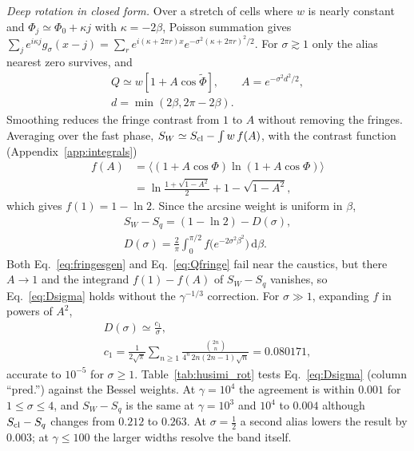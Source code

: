 \documentclass[pra,twocolumn,superscriptaddress,longbibliography,floatfix]{revtex4-2}
\newcommand{\dd}{\mathrm{d}}
\newcommand{\Scl}{S_{\rm cl}}
\newcommand{\SW}{S_{W}}
\begin{document}
\emph{Deep rotation in closed form.} Over a stretch of cells where $w$ is nearly
constant and $\Phi_{j}\simeq\Phi_{0}+\kappa j$ with $\kappa=-2\beta$, Poisson
summation gives $\sum_{j}e^{i\kappa j}g_{\sigma}(x-j)=\sum_{r}
e^{i(\kappa+2\pi r)x}e^{-\sigma^{2}(\kappa+2\pi r)^{2}/2}$. For $\sigma\gtrsim1$
only the alias nearest zero survives, and
\begin{equation}
\begin{gathered}
Q\simeq w\left[1+A\cos\tilde\Phi\right],\qquad A=e^{-\sigma^{2}d^{2}/2},\\
d=\min(2\beta,2\pi-2\beta).
\end{gathered}
\label{eq:Qfringe}
\end{equation}
Smoothing reduces the fringe contrast from $1$ to $A$ without removing the
fringes. Averaging over the fast phase,
$\SW\simeq\Scl-\int w\,f(A)$, with the contrast function
(Appendix~\ref{app:integrals})
\begin{equation}
\begin{split}
f(A)&=\big\langle(1+A\cos\Phi)\ln(1+A\cos\Phi)\big\rangle\\
&=\ln\frac{1+\sqrt{1-A^{2}}}{2}+1-\sqrt{1-A^{2}},
\end{split}
\label{eq:fA}
\end{equation}
which gives $f(1)=1-\ln2$. Since the arcsine weight is uniform in $\beta$,
\begin{equation}
\begin{gathered}
\SW-S_{q}=\left(1-\ln2\right)-D(\sigma),\\
D(\sigma)=\frac{2}{\pi}\int_{0}^{\pi/2}f\big(e^{-2\sigma^{2}\beta^{2}}\big)\,\dd\beta .
\end{gathered}
\label{eq:Dsigma}
\end{equation}
Both Eq.~\eqref{eq:fringesgen} and Eq.~\eqref{eq:Qfringe} fail near the
caustics, but there $A\to1$ and the integrand $f(1)-f(A)$ of $\SW-S_{q}$
vanishes, so Eq.~\eqref{eq:Dsigma} holds without the $\gamma^{-1/3}$ correction.
For $\sigma\gg1$, expanding $f$ in powers of $A^{2}$,
\begin{equation}
\begin{gathered}
D(\sigma)\simeq\frac{c_{1}}{\sigma},\\
c_{1}=\frac{1}{2\sqrt\pi}\sum_{n\ge1}\frac{\binom{2n}{n}}{4^{n}\,2n(2n-1)\sqrt n}=0.080171,
\end{gathered}
\label{eq:c1}
\end{equation}
accurate to $10^{-5}$ for $\sigma\ge1$. Table~\ref{tab:husimi_rot} tests
Eq.~\eqref{eq:Dsigma} (column ``pred.'') against the Bessel weights. At $\gamma=10^{4}$ the agreement
is within $0.001$ for $1\le\sigma\le4$, and $\SW-S_{q}$ is the same at
$\gamma=10^{3}$ and $10^{4}$ to $0.004$ although $\Scl-S_{q}$ changes from $0.212$ to
$0.263$. At $\sigma=\tfrac12$ a second alias lowers the result by $0.003$; at
$\gamma\le100$ the larger widths resolve the band itself.
\end{document}
